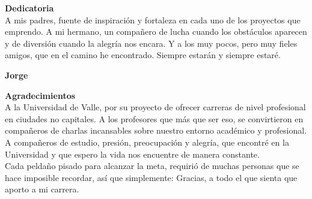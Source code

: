 \thispagestyle{fancy}
\setcounter{page}{5}
\Huge \textbf{Dedicatoria}\\[3.5cm]
\normalsize
A mis padres, fuente de inspiración y fortaleza en cada uno de los proyectos que emprendo. A mi hermano, un compañero de lucha cuando los obstáculos aparecen y de diversión cuando la alegría nos encara. Y a los muy pocos, pero muy fieles amigos, que en el camino he encontrado. Siempre estarán y siempre estaré.
\begin{flushright}
\textbf{Jorge} \end{flushright}
\newpage



\thispagestyle{fancy}
\Huge \textbf{Agradecimientos}\\[3.5cm]
\normalsize
A la Universidad de Valle, por su proyecto de ofrecer carreras de nivel profesional en ciudades no capitales. A los profesores que más que ser eso, se convirtieron en compañeros de charlas incansables sobre nuestro entorno académico y profesional.
\\
A compañeros de estudio, presión, preocupación y alegría, que encontré en la Universidad y que espero la vida nos encuentre de manera constante.
\\
Cada peldaño pisado para alcanzar la meta, requirió de muchas personas que se hace imposible recordar, así que simplemente: Gracias, a todo el que sienta que aporto a mi carrera.
\\





